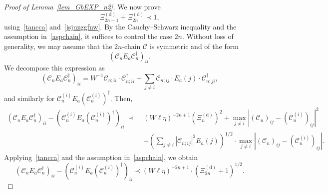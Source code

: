 \documentclass[10pt,reqno]{article}
\theoremstyle{plain} %
\theoremstyle{remark}
\numberwithin{equation}{section}
\begin{document}
\begin{proof}[Proof of Lemma~\ref{lem_GbEXP_n2}]
We now  prove
\begin{equation}\label{juwiuo2pl}
    \Xi^{(\mathrm{d})}_{2n-1} + \Xi^{(\mathrm{d})}_{2n} \prec 1,
\end{equation}
using~\eqref{tancca} and~\eqref{jsjuzggfnw}. By the Cauchy–Schwarz inequality and the assumption in~\eqref{aspchain}, it suffices to control the case \( 2n \). Without loss of generality, we may assume that the $2n$-chain \( \mathcal{C} \) is symmetric and of the form
\[
\left( \mathcal{C}_n E_a \mathcal{C}_n^\dagger \right)_{ii}.
\]
We decompose this expression as
\[
\left( \mathcal{C}_n E_a \mathcal{C}_n^\dagger \right)_{ii}
= W^{-1} \mathcal{C}_{n; ii} \cdot \mathcal{C}^\dagger_{n; ii}
+ \sum_{j \ne i} \mathcal{C}_{n; ij} \cdot E_a(j) \cdot \mathcal{C}^\dagger_{n; ji},
\]
and similarly for \( \mathcal{C}_n^{(i)} E_a \left(\mathcal{C}_n^{(i)}\right)^\dagger \). Then,
\begin{align*}
\left( \mathcal{C}_n E_a \mathcal{C}_n^\dagger \right)_{ii}
- \left( \mathcal{C}_n^{(i)} E_a \left( \mathcal{C}_n^{(i)} \right)^\dagger \right)_{ii}
\;\prec\;& (W \ell \eta)^{-2n + 1} \left( \Xi_n^{(\mathrm{d})} \right)^2
+ \max_{j \ne i} \left| \left( \mathcal{C}_n \right)_{ij} - \left( \mathcal{C}_n^{(i)} \right)_{ij} \right|^2\\
&+ \left( \sum_{j \ne i} \left| \mathcal{C}_{n; ij} \right|^2 E_a(j) \right)^{1/2} \cdot \max_{j \ne i} \left| \left( \mathcal{C}_n \right)_{ij} - \left( \mathcal{C}_n^{(i)} \right)_{ij} \right|.
\end{align*}
Applying~\eqref{tancca} and the assumption in~\eqref{aspchain}, we obtain
\begin{equation}\label{j,mssl}
\left( \mathcal{C}_n E_a \mathcal{C}_n^\dagger \right)_{ii}
- \left( \mathcal{C}_n^{(i)} E_a \left( \mathcal{C}_n^{(i)} \right)^\dagger \right)_{ii}
\prec (W \ell \eta)^{-2n + 1} \cdot \left( \Xi_{2n}^{(\mathrm{d})} + 1 \right)^{1/2}.
\end{equation}


\end{proof}
\end{document}
